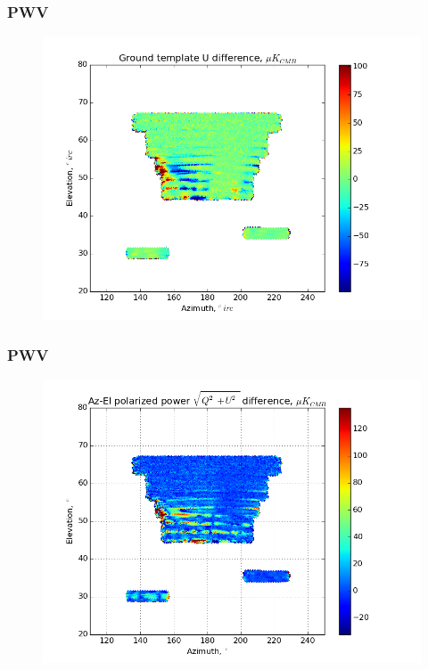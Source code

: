 \documentclass{beamer}
\begin{document}
\begin{frame}
\frametitle{PWV}
\begin{figure}
\includegraphics[width=0.9\linewidth]{dU_gt_PWV.png}
\end{figure}
\end{frame}

\begin{frame}
\frametitle{PWV}
\begin{figure}
\includegraphics[width=0.9\linewidth]{dMag_gt_PWV.png}
\end{figure}
\end{frame}
\end{document}
